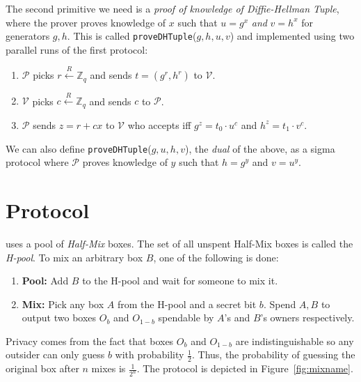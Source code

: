 \documentclass[runningheads]{llncs}
\begin{document}
The second primitive we need is a {\em proof of knowledge of Diffie-Hellman Tuple}, where the prover proves knowledge of $x$ such that $u = g^x$ {\em and} $v = h^x$ for generators $g, h$.
This is called \texttt{proveDHTuple}($g, h, u, v$) and implemented using two parallel runs of the first protocol:

\begin{enumerate}
	\item $\mathcal{P}$ picks $r \stackrel{R}{\leftarrow} \mathbb{Z}_q$ and sends $t = ({g}^r, {h}^r)$ to $\mathcal{V}$.
	\item $\mathcal{V}$ picks $c \stackrel{R}{\leftarrow} \mathbb{Z}_q$ and sends $c$ to $\mathcal{P}$.
	\item $\mathcal{P}$ sends $z = r + cx$ to $\mathcal{V}$ who accepts iff ${g}^z = {t_0}\cdot {u}^c$ and $h^z=t_1\cdot v^c$.
\end{enumerate}

We can also define \texttt{proveDHTuple}($g, u, h, v$), the {\em dual} of the above, as a sigma protocol where $\mathcal{P}$ proves knowledge of $y$ such that $h = g^y$ and $v = u^y$.


\section{\algname Protocol}

\algname uses a pool of {\em Half-Mix} boxes. The set of all unspent Half-Mix boxes is called the {\em H-pool}. To mix an arbitrary box $B$, one of the following is done:
\begin{enumerate}
	\item \textbf{Pool:} Add $B$ to the H-pool and wait for someone to mix it.
	\item \textbf{Mix:} Pick any box $A$ from the H-pool and a secret bit $b$. Spend $A, B$ to 
	output two boxes $O_b$ and $O_{1-b}$ spendable by $A$'s and $B$'s owners respectively.
\end{enumerate}

Privacy comes from the fact that boxes $O_b$ and $O_{1-b}$ are indistinguishable so any outsider can only guess $b$ with probability $\frac{1}{2}$. Thus, the probability of guessing the original box after $n$ mixes is $\frac{1}{2^n}$. The protocol is depicted in Figure~\ref{fig:mixname}. 
\end{document}
